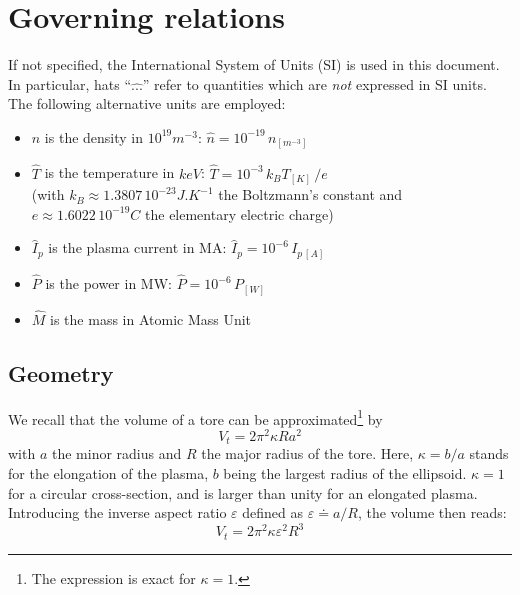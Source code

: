 
\section{Governing relations}

If not specified, the International System of Units (SI) is used in this document.
In particular, hats ``$\hat{...}$'' refer to quantities which are \emph{not} expressed in SI units. The following alternative units are employed: 
\begin{itemize}
    \item $\hat n$ is the density in $10^{19} \si{m^{-3}}$: 
    $\hat n = 10^{-19}\,n_{\si{[m^{-3}]}}$
    \item $\hat T$ is the temperature in $keV$: $\hat T = 10^{-3}\, k_B T_{[K]}\,/e$ \\(with $k_B \approx 1.3807\, 10^{-23} \si{J.K^{-1}}$ the Boltzmann's constant and $e\approx 1.6022\, 10^{-19}C$ the elementary electric charge)
    \item $\hat I_p$ is the plasma current in MA: $\hat I_p = 10^{-6}\,I_{p\,[A]}$
    \item $\hat P$ is the power in MW: $\hat P = 10^{-6}\, P_{[W]}$
    \item $\hat M$ is the mass in Atomic Mass Unit
\end{itemize}

\subsection{Geometry}

We recall that the volume of a tore can be approximated\footnote{The expression is exact for $\kappa=1$.} by 
\begin{equation}
V_t = 2\pi^2 \kappa R a^2
\end{equation}
with $a$ the minor radius and $R$ the major radius of the tore. Here, $\kappa=b/a$ stands for the elongation of the plasma, $b$ being the largest radius of the ellipsoid. $\kappa=1$ for a circular cross-section, and is larger than unity for an elongated plasma.
Introducing the inverse aspect ratio $\varepsilon$ defined as $\varepsilon  \doteq a /R$, the volume then reads:
\begin{equation}
\boxed{V_t = 2\pi^2 \kappa \varepsilon^2 R^3}
\label{eqn:tore_volume}
\end{equation}

